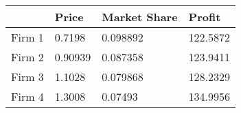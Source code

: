 \begin{tabular}{llll}
& Price & Market Share & Profit \\ 
\hline 
Firm 1 & 0.7198 & 0.098892 & 122.5872 \\ 
Firm 2 & 0.90939 & 0.087358 & 123.9411 \\ 
Firm 3 & 1.1028 & 0.079868 & 128.2329 \\ 
Firm 4 & 1.3008 & 0.07493 & 134.9956 \\ 
\hline 
\end{tabular}